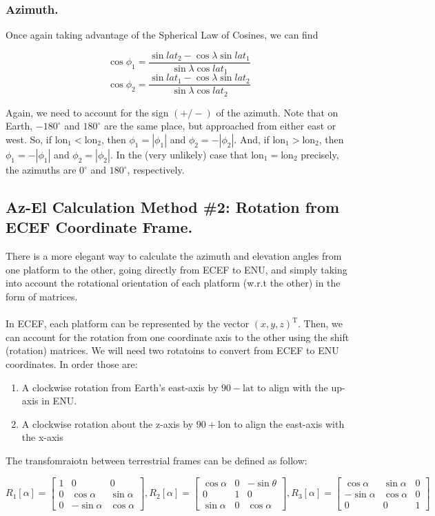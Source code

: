 \documentclass{article}
\begin{document}
\subsubsection*{Azimuth.}
Once again taking advantage of the Spherical Law of Cosines, we can find

$$\cos\phi_1 = \frac{\sin lat_2 - \cos\lambda \sin lat_1}{\sin\lambda\cos lat_1}$$
$$\cos\phi_2 = \frac{\sin lat_1 - \cos\lambda \sin lat_2}{\sin\lambda\cos lat_2}$$

Again, we need to account for the sign $(+/-)$ of the azimuth. Note that on Earth, $-180^{\circ}$
and $180^{\circ}$ are the same place, but approached from either east or west. So,
if $\text{lon}_1 < \text{lon}_2$, then $\phi_1 = |\phi_1|$ and $\phi_2 = -|\phi_2|$. And, if 
$\text{lon}_1 > \text{lon}_2$, 
then $\phi_1 = -|\phi_1|$ and $\phi_2 = |\phi_2|$. In the (very unlikely) case that
$\text{lon}_1 = \text{lon}_2$ precisely, the azimuths are $0^{\circ}$ and $180^{\circ}$, respectively.

\subsection{Az-El Calculation Method \#2: Rotation from ECEF Coordinate Frame.}
There is a more elegant way to calculate the azimuth and elevation angles from one platform
to the other, going directly from ECEF to ENU, and simply taking into account the rotational orientation
of each platform (w.r.t the other) in the form of matrices. \\\\
In ECEF, each platform can be represented by the vector $(x,y,z)^\text{T}$. Then, we can account for the rotation
from one coordinate axis to the other using the shift (rotation) matrices. We will need two rotatoins to convert from ECEF to 
ENU coordinates. In order those are:

\begin{enumerate}
  \item A clockwise rotation from Earth's east-axis by $90-\text{lat}$ to align with
  the up-axis in ENU. 
  \item  A clockwise rotation about the z-axis by $90+$lon to align the east-axis with the x-axis
\end{enumerate}

The transfomraiotn between terrestrial frames can be defined as follow:

$$R_1[\alpha] = \begin{bmatrix}
  1&0&0\\
  0&\cos\alpha&\sin\alpha\\
  0&-\sin\alpha&\cos\alpha
\end{bmatrix}, R_2[\alpha] =\begin{bmatrix}
  \cos\alpha&0&-\sin\theta\\
  0&1&0\\
  \sin\alpha&0&\cos\alpha
\end{bmatrix}, R_3[\alpha] = \begin{bmatrix}
  \cos\alpha&\sin\alpha&0\\
  -\sin\alpha&\cos\alpha&0\\
  0&0&1
\end{bmatrix}$$
\end{document}

